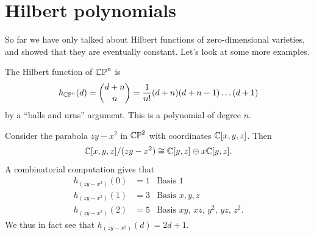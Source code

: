 \section{Hilbert polynomials}
So far we have only talked about Hilbert functions
of zero-dimensional varieties, and showed that
they are eventually constant.
Let's look at some more examples.
\begin{example}
	The Hilbert function of $\mathbb{CP}^n$ is
	\[ h_{\mathbb{CP}^n}(d) = \binom{d+n}{n}
	= \frac{1}{n!} (d+n)(d+n-1) \dots (d+1) \]
	by a ``balls and urns'' argument.
	This is a polynomial of degree $n$.
\end{example}
\begin{example}
	Consider the parabola $zy-x^2$ in $\mathbb{CP}^2$
	with coordinates $\mathbb C[x,y,z]$.
	Then
	\[ \mathbb C[x,y,z] / (zy-x^2) \cong \mathbb C[y,z] \oplus x\mathbb C[y,z]. \]
	A combinatorial computation gives that
	\begin{align*}
		h_{(zy-x^2)}(0) &= 1 & \text{Basis $1$} \\
		h_{(zy-x^2)}(1) &= 3 & \text{Basis $x,y,z$} \\
		h_{(zy-x^2)}(2) &= 5 & \text{Basis $xy$, $xz$, $y^2$, $yz$, $z^2$}.
	\end{align*}
	We thus in fact see that $h_{(zy-x^2)}(d) = 2d+1$.
\end{example}

